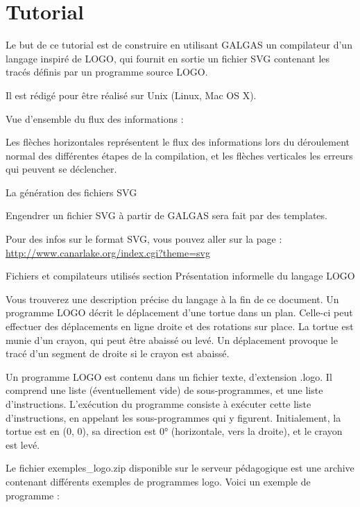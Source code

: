 
\chapter{Tutorial}

Le but de ce tutorial est de construire en utilisant GALGAS un compilateur d’un langage inspiré de LOGO, qui fournit en sortie un fichier SVG contenant les tracés définis par un programme source LOGO.


Il est rédigé pour être réalisé sur Unix (Linux, Mac OS X).

Vue d'ensemble du flux des informations :

Les flèches horizontales représentent le flux des informations lors du déroulement normal des différentes étapes de la compilation, et les flèches verticales les erreurs qui peuvent se déclencher.

La génération des fichiers SVG

Engendrer un fichier SVG à partir de GALGAS sera fait par des templates.


Pour des infos sur le format SVG, vous pouvez aller sur la page :
\url{http://www.canarlake.org/index.cgi?theme=svg}

Fichiers et compilateurs utilisés
section {Présentation informelle du langage LOGO}

Vous trouverez une description précise du langage à la fin de ce document. Un programme LOGO décrit le déplacement d'une tortue dans un plan. Celle-ci peut effectuer des déplacements en ligne droite et des rotations sur place. La tortue est munie d'un crayon, qui peut être abaissé ou levé. Un déplacement provoque le tracé d'un segment de droite si le crayon est abaissé.

Un programme LOGO est contenu dans un fichier texte, d'extension .logo. Il comprend une liste (éventuellement vide) de sous-programmes, et une liste d'instructions. L'exécution du programme consiste à exécuter cette liste d'instructions, en appelant les sous-programmes qui y figurent. Initialement, la tortue est en (0, 0), sa direction est 0° (horizontale, vers la droite), et le crayon est levé.


Le fichier exemples\_logo.zip disponible sur le serveur pédagogique est une archive contenant différents exemples de programmes logo. Voici un exemple de programme :

